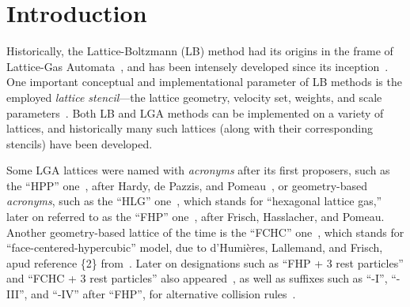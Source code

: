 \section{Introduction}

    Historically,   the   Lattice-Boltzmann   (LB)    method    had    its    origins    in    the    frame    of    Lattice-Gas
    Automata~\cite{1988-McNamaraGR+ZanettiG-PhysRevLett},     and     has     been     intensely     developed     since     its
    inception~\cite{2018-KrugerT+ViggenEM-Springer}. One important conceptual and implementational parameter of  LB  methods  is
    the    employed    \emph{lattice    stencil}---the    lattice    geometry,    velocity    set,    weights,     and     scale
    parameters~\cite{2013-HegeleJr+PhilippiPC-JSciComput,                                2013-MattilaKK+PhilippiPC-IntJModPhysC,
    2014-MattilaKK+PhilippiPC-SciWorldJ}. Both LB and LGA methods can be implemented on a variety of lattices, and  historically
    many such lattices (along with their corresponding stencils) have been developed.

    Some   LGA   lattices   were   named   with   \emph{acronyms}   after   its   first   proposers,   such   as   the   ``HPP''
    one~\cite{1986-FrischU+PomeauY-PhysRevLett},  after  Hardy,  de  Pazzis,   and   Pomeau~\cite{1973-HardyJ+PazzisO-JMathPhys,
    1976-HardyJ+PomeauY-PhysRevA,  1987-SucciS-JPhysAMathGen},  or  geometry-based  \emph{acronyms},   such   as   the   ``HLG''
    one~\cite{1986-FrischU+PomeauY-PhysRevLett}, which stands for ``hexagonal lattice gas,'' later on referred to as the ``FHP''
    one~\cite{1987-FrischU+RivetJP-ComplexSyst,  1987-SucciS-JPhysAMathGen},  after  Frisch,  Hasslacher,  and  Pomeau.  Another
    geometry-based  lattice  of  the  time  is  the  ``FCHC''  one~\cite{1987-FrischU+RivetJP-ComplexSyst},  which  stands   for
    ``face-centered-hypercubic''   model,   due   to   d'Humières,    Lallemand,    and    Frisch,    apud    reference    \{2\}
    from~\cite{1987-FrischU+RivetJP-ComplexSyst}. Later on designations such as ``FHP + 3 rest particles'' and ``FCHC +  3  rest
    particles'' also appeared~\cite{1991-BoonJP-PhysD}, as well as suffixes such as ``-I'', ``-III'', and ``-IV'' after ``FHP'',
    for alternative collision rules~\cite{1991-AppertC+ZaleskiS-PhysD, 1991-BoonJP-PhysD, 1991-ChenS+RoseH-PhysD}.


